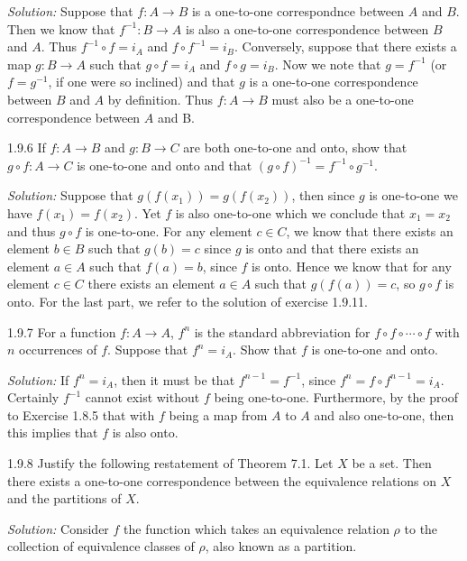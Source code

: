 \documentclass{letter}
\newcommand{\tmtextit}[1]{{\itshape{#1}}}
\newcommand{\um}{-}
\begin{document}
\tmtextit{Solution:} Suppose that $f : A \rightarrow B$ is a one-to-one
correspondnce between $A$ and $B$. Then we know that $f^{- 1} : B \rightarrow
A$ is also a one-to-one correspondence between $B$ and $A$. Thus $f^{- 1}
\circ f = i_A$ and $f \circ f^{- 1} = i_B$. Conversely, suppose that there
exists a map $g : B \rightarrow A$ such that $g \circ f = i_A$ and $f \circ g
= i_B$. Now we note that $g = f^{- 1}$ (or $f = g^{- 1}$, if one were so
inclined) and that $g$ is a one-to-one correspondence between $B$ and $A$ by
definition. Thus $f : A \rightarrow B$ must also be a one-to-one
correspondence between $A$ and B.

1.9.6 If $f : A \rightarrow B$ and $g : B \rightarrow C$ are both one-to-one
and onto, show that $g \circ f : A \rightarrow C$ is one-to-one and onto and
that $(g \circ f)^{\um 1} = f^{\um 1} \circ g^{\um 1}$.

\tmtextit{Solution:} Suppose that $g (f (x_1)) = g (f (x_2))$, then since $g$
is one-to-one we have $f (x_1) = f (x_2)$. Yet $f$ is also one-to-one which we
conclude that $x_1 = x_2$ and thus $g \circ f$ is one-to-one. For any element
$c \in C$, we know that there exists an element $b \in B$ such that $g (b) =
c$ since $g$ is onto and that there exists an element $a \in A$ such that $f
(a) = b$, since $f$ is onto. Hence we know that for any element $c \in C$
there exists an element $a \in A$ such that $g (f (a)) = c$, so $g \circ f$ is
onto. For the last part, we refer to the solution of exercise 1.9.11.

1.9.7 For a function $f : A \rightarrow A$, $f^n$ is the standard abbreviation
for $f \circ f \circ \cdots \circ f$ with $n$ occurrences of $f$. Suppose that
$f^n = i_A$. Show that $f$ is one-to-one and onto.

\tmtextit{Solution:} If $f^n = i_A$, then it must be that $f^{n - 1} = f^{-
1}$, since $f^n = f \circ f^{n - 1} = i_A$. Certainly $f^{- 1}$ cannot exist
without $f$ being one-to-one. Furthermore, by the proof to Exercise 1.8.5 that
with $f$ being a map from $A$ to $A$ and also one-to-one, then this implies
that $f$ is also onto.

1.9.8 Justify the following restatement of Theorem 7.1. Let $X$ be a set. Then
there exists a one-to-one correspondence between the equivalence relations on
$X$ and the partitions of $X$.

\tmtextit{Solution:} Consider $f$ the function which takes an equivalence
relation $\rho$ to the collection of equivalence classes of $\rho$, also known
as a partition.
\end{document}
